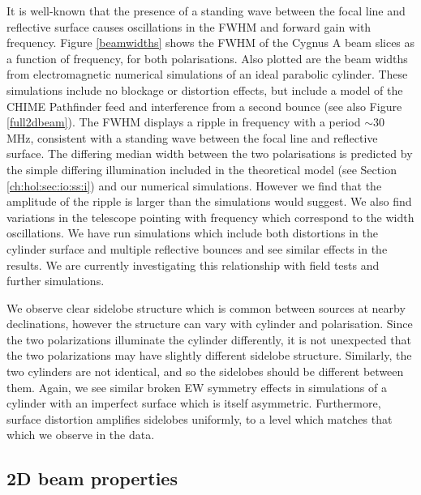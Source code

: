 It is well-known \citep{wander1, wander2} that the presence of a standing wave between the focal line and reflective surface causes oscillations in the FWHM and forward gain with frequency. Figure \ref{beamwidths} shows the FWHM of the Cygnus A beam slices as a function of frequency, for both polarisations. Also plotted are the beam widths from electromagnetic numerical simulations of an ideal parabolic cylinder. These simulations include no blockage or distortion effects, but include a model of the CHIME Pathfinder feed \citep{meiling} and interference from a second bounce (see also Figure \ref{full2dbeam}). The FWHM displays a ripple in frequency with a period $\sim$30 MHz, consistent with a standing wave between the focal line and reflective surface. The differing median width between the two polarisations is predicted by the simple differing illumination included in the theoretical model (see Section \ref{ch:hol:sec:io:ss:i}) and our numerical simulations. However we find that the amplitude of the ripple is larger than the simulations would suggest. We also find variations in the telescope pointing with frequency which correspond to the width oscillations. We have run simulations which include both distortions in the cylinder surface and multiple reflective bounces and see similar effects in the results. We are currently investigating this relationship with field tests and further simulations.

We observe clear sidelobe structure which is common between sources at nearby declinations, however the structure can vary with cylinder and polarisation. Since the two polarizations illuminate the cylinder differently, it is not unexpected that the two polarizations may have slightly different sidelobe structure. Similarly, the two cylinders are not identical, and so the sidelobes should be different between them. Again, we see similar broken EW symmetry effects in simulations of a cylinder with an imperfect surface which is itself asymmetric. Furthermore, surface distortion amplifies sidelobes uniformly, to a level which matches that which we observe in the data.

\subsection{2D beam properties}

